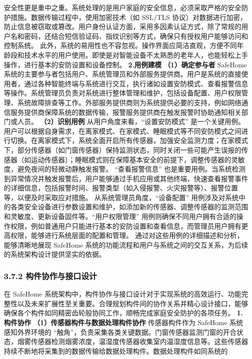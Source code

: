 安全性更是重中之重。系统处理的是用户家庭的安全信息，必须采取严格的安全防护措施。数据传输过程中，使用加密技术（如 SSL/TLS
协议）对数据进行加密，防止信息被窃取或篡改。用户身份认证方面，采用多因素认证方式，除了常规的用户名和密码，还结合短信验证码、指纹识别等方式，确保只有授权用户能够访问和控制系统。
此外，系统的易用性也不容忽视。操作界面应简洁直观，方便不同年龄段和技术水平的用户使用。即使是对智能设备不太熟悉的老年人，也能轻松上手操作，进行基本的安防设置和设备控制。 \textbf{2.用例建模} \textbf{（1）确定参与者}
SafeHome
系统的主要参与者包括用户、系统管理员和外部服务提供商。用户是系统的直接使用者，通过各种智能终端与系统进行交互，执行诸如设置安防模式、查看报警信息等操作。系统管理员负责对系统进行整体管理和维护，包括设备配置、用户权限管理、系统故障排查等工作。外部服务提供商则为系统提供必要的支持，例如网络通信服务提供商保障系统的数据传输，报警服务提供商在触发报警时协助通知相关部门或人员。
\textbf{（2）识别用例} 从用户角度来看，``设置安防模式''
是一个关键用例。用户可以根据自身需求，在离家模式、在家模式、睡眠模式等不同安防模式之间进行切换。在离家模式下，系统全面开启所有传感器，加强安全监测力度；在家模式下，部分传感器（如门窗传感器）保持监测状态，同时关闭一些可能产生误报的传感器（如运动传感器）；睡眠模式则在保障基本安全的前提下，调整传感器的灵敏度，避免夜间的轻微动静触发报警。
``查看报警信息'' 也是重要用例。当系统检测到异常情况并触发报警后，用户能够通过手机应用或其他终端，快速查看报警事件的详细信息，包括报警时间、报警类型（如入侵报警、火灾报警等）、报警位置等，以便及时采取应对措施。
从系统管理员角度，``设备配置'' 用例涉及对系统中的各类安全设备进行参数设置和维护，如添加新的传感器、调整传感器的监测范围和灵敏度、更新设备固件等。``用户权限管理''
用例则确保不同用户拥有合适的操作权限，例如普通用户只能进行基本的安防设置和查看信息，而管理员用户拥有更高权限，能够进行系统层面的配置和管理。 通过对这些用例的详细描述和分析，能够清晰地展现 SafeHome
系统的功能流程和用户与系统之间的交互关系，为后续的系统架构设计提供坚实的依据。 \subsubsection{3.7.2
构件协作与接口设计}\label{ux6784ux4ef6ux534fux4f5cux4e0eux63a5ux53e3ux8bbeux8ba1} 在 SafeHome
系统架构中，构件协作与接口设计对于实现系统的高效运行、功能完整性以及未来扩展性至关重要。合理规划构件间的协作关系并精心设计接口，能够确保各个构件如同精密齿轮般协同工作，顺畅完成家庭安全防护的各项任务。 \textbf{1.构件协作}
\textbf{（1）传感器构件与数据处理构件协作} 传感器构件作为 SafeHome 系统感知外界环境的
``触角''，负责采集各类关键数据。门窗传感器监测门窗的开合状态，烟雾传感器检测烟雾浓度，温湿度传感器收集室内温湿度信息等。这些传感器持续不断地将采集到的数据传输给数据处理构件。数据处理构件如同系统的
